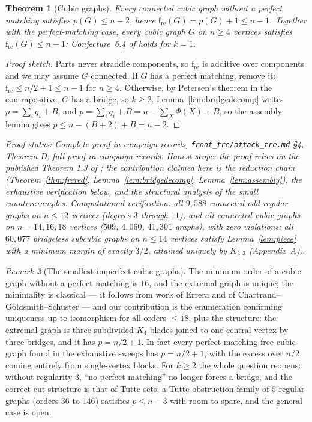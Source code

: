 \documentclass[a4paper,11pt]{amsart}
\newtheorem{theorem}{Theorem}[section]
\theoremstyle{definition}
\theoremstyle{remark}
\newtheorem{remark}[theorem]{Remark}
\newcommand{\fre}{\operatorname{f_{re}}}
\newcommand{\proofsrc}[1]{\par\smallskip\noindent\begin{sloppypar}\small\emph{Proof status: #1.}\end{sloppypar}\par\smallskip}
\begin{document}
\begin{theorem}[Cubic graphs]\label{thm:cubicpmfree}
Every connected cubic graph without a perfect matching satisfies $p(G)\le n-2$, hence
$\fre(G)=p(G)+1\le n-1$. Together with the perfect-matching case, every cubic graph $G$ on $n\ge4$
vertices satisfies $\fre(G)\le n-1$: Conjecture~6.4 of \cite{AABC25} holds for $k=1$.
\end{theorem}
\begin{proof}[Proof sketch]
Parts never straddle components, so $\fre$ is additive over components and we may assume $G$ connected.
If $G$ has a perfect matching, remove it: $\fre\le n/2+1\le n-1$ for $n\ge4$. Otherwise, by Petersen's
theorem in the contrapositive, $G$ has a bridge, so $k\ge2$. Lemma~\ref{lem:bridgedecomp} writes
$p=\sum_i q_i+B$, and $p=\sum_i q_i+B=n-\sum_X\Phi(X)+B$, so the assembly lemma gives
$p\le n-(B+2)+B=n-2$.
\end{proof}
\proofsrc{Complete proof in campaign records, \texttt{front\_tre/attack\_tre.md} \S4, Theorem D; full proof
in campaign records. Honest scope: the proof relies on the published Theorem 1.3 of \cite{CKKPW19}; the
contribution claimed here is the reduction chain (Theorem~\ref{thm:frered},
Lemma~\ref{lem:bridgedecomp}, Lemma~\ref{lem:assembly}), the exhaustive verification below, and the
structural analysis of the small counterexamples. Computational verification: all $9{,}588$ connected
odd-regular graphs on $n\le12$ vertices (degrees $3$ through $11$), and all connected cubic graphs on
$n=14,16,18$ vertices ($509$, $4{,}060$, $41{,}301$ graphs), with zero violations; all $60{,}077$
bridgeless subcubic graphs on $n\le14$ vertices satisfy Lemma~\ref{lem:piece} with a minimum margin of
exactly $3/2$, attained uniquely by $K_{2,3}$ (Appendix~A).}

\begin{remark}[The smallest imperfect cubic graphs]\label{rem:minpmfree}
The minimum order of a cubic graph without a perfect matching is $16$, and the extremal graph is unique;
the minimality is classical --- it follows from work of Errera and of Chartrand--Goldsmith--Schuster
\cite{CGS79} --- and our contribution is the enumeration confirming uniqueness up to isomorphism for all
orders $\le18$, plus the structure: the extremal graph is three subdivided-$K_4$ blades joined to one
central vertex by three bridges, and it has $p=n/2+1$. In fact every perfect-matching-free cubic graph
found in the exhaustive sweeps has $p=n/2+1$, with the excess over $n/2$ coming entirely from
single-vertex blocks. For $k\ge2$ the whole question reopens: without regularity $3$, ``no perfect
matching'' no longer forces a bridge, and the correct cut structure is that of Tutte sets; a
Tutte-obstruction family of $5$-regular graphs (orders $36$ to $146$) satisfies $p\le n-3$ with room to
spare, and the general case is open.
\end{remark}
\end{document}
